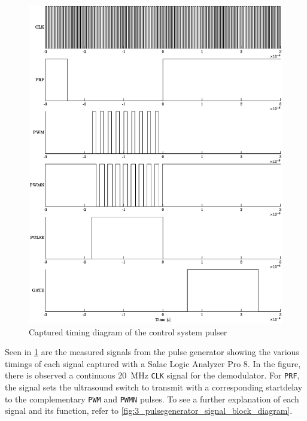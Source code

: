 \begin{figure}[htbp]
	\centering
	\includegraphics[width=\linewidth]{Figures/5_controlsystem_fpga_pulser_logic.eps}
	\caption{Captured timing diagram of the control system pulser}
	\label{fig:5_controlsystem_pulser_logic}
\end{figure}
Seen in \cref{fig:5_controlsystem_pulser_logic} are the measured signals from the pulse generator showing the various timings of each signal captured with a Salae Logic Analyzer Pro 8. In the figure, there is observed a continuous \qty{20}{\mega\hertz} \texttt{CLK} signal for the demodulator. For \texttt{PRF}, the signal sets the ultrasound switch to transmit with a corresponding startdelay to the complementary \texttt{PWM} and \texttt{PWMN} pulses. To see a further explanation of each signal and its function, refer to \cref{fig:3_pulsegenerator_signal_block_diagram}.

